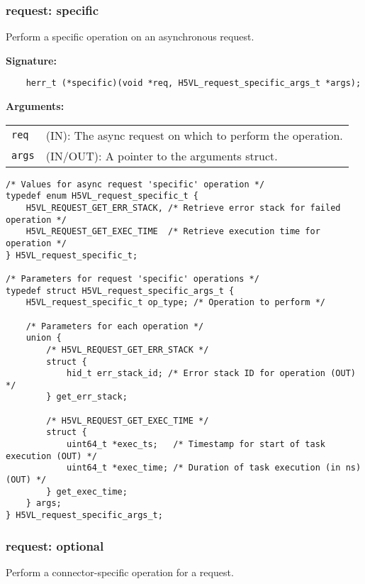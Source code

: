 \subsubsection{request: specific}
Perform a specific operation on an asynchronous request.

\begin{mdframed}[style=bgbox]
\textbf{Signature:}
\begin{lstlisting}
    herr_t (*specific)(void *req, H5VL_request_specific_args_t *args);
\end{lstlisting}

\textbf{Arguments:}\\
\begin{tabular}{l p{13.5cm}}
  \texttt{req} & (IN): The async request on which to perform the operation.\\
  \texttt{args} & (IN/OUT): A pointer to the arguments struct.\\
\end{tabular}
\end{mdframed}

\begin{lstlisting}
/* Values for async request 'specific' operation */
typedef enum H5VL_request_specific_t {
    H5VL_REQUEST_GET_ERR_STACK, /* Retrieve error stack for failed operation */
    H5VL_REQUEST_GET_EXEC_TIME  /* Retrieve execution time for operation */
} H5VL_request_specific_t;

/* Parameters for request 'specific' operations */
typedef struct H5VL_request_specific_args_t {
    H5VL_request_specific_t op_type; /* Operation to perform */

    /* Parameters for each operation */
    union {
        /* H5VL_REQUEST_GET_ERR_STACK */
        struct {
            hid_t err_stack_id; /* Error stack ID for operation (OUT) */
        } get_err_stack;

        /* H5VL_REQUEST_GET_EXEC_TIME */
        struct {
            uint64_t *exec_ts;   /* Timestamp for start of task execution (OUT) */
            uint64_t *exec_time; /* Duration of task execution (in ns) (OUT) */
        } get_exec_time;
    } args;
} H5VL_request_specific_args_t;

\end{lstlisting}

\subsubsection{request: optional}
Perform a connector-specific operation for a request.

